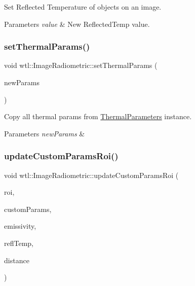 Set Reflected Temperature of objects on an image. 


\begin{DoxyParams}{Parameters}
{\em value} & New Reflected\+Temp value. \\
\hline
\end{DoxyParams}
\mbox{\label{classwtl_1_1_image_radiometric_af84a54aef49c990a1795aa20be584cae}} 
\subsubsection{\texorpdfstring{set\+Thermal\+Params()}{setThermalParams()}}
{\footnotesize\ttfamily void wtl\+::\+Image\+Radiometric\+::set\+Thermal\+Params (\begin{DoxyParamCaption}\item[{const std\+::shared\+\_\+ptr$<$ \hyperlink{structwtl_1_1_thermal_parameters}{wtl\+::\+Thermal\+Parameters} $>$ \&}]{new\+Params }\end{DoxyParamCaption})}



Copy all thermal params from \hyperlink{structwtl_1_1_thermal_parameters}{Thermal\+Parameters} instance. 


\begin{DoxyParams}{Parameters}
{\em new\+Params} & \\
\hline
\end{DoxyParams}
\mbox{\label{classwtl_1_1_image_radiometric_aa9b47acd750ac06f7cd19601f6641ebc}} 
\subsubsection{\texorpdfstring{update\+Custom\+Params\+Roi()}{updateCustomParamsRoi()}}
{\footnotesize\ttfamily void wtl\+::\+Image\+Radiometric\+::update\+Custom\+Params\+Roi (\begin{DoxyParamCaption}\item[{\hyperlink{structwtl_1_1_roi_struct}{Roi\+Struct} \&}]{roi,  }\item[{bool}]{custom\+Params,  }\item[{float}]{emissivity,  }\item[{float}]{refl\+Temp,  }\item[{float}]{distance }\end{DoxyParamCaption})}



